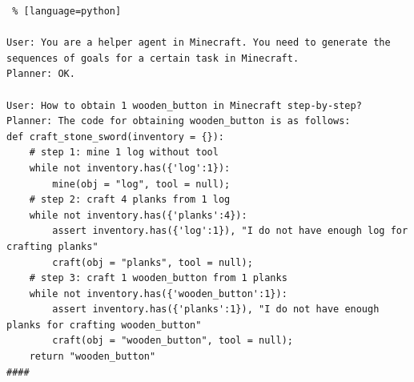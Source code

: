 \begin{lstlisting} % [language=python]  

User: You are a helper agent in Minecraft. You need to generate the sequences of goals for a certain task in Minecraft.
Planner: OK.

User: How to obtain 1 wooden_button in Minecraft step-by-step?
Planner: The code for obtaining wooden_button is as follows:
def craft_stone_sword(inventory = {}):
    # step 1: mine 1 log without tool
    while not inventory.has({'log':1}):
        mine(obj = "log", tool = null); 
    # step 2: craft 4 planks from 1 log
    while not inventory.has({'planks':4}):
        assert inventory.has({'log':1}), "I do not have enough log for crafting planks"
        craft(obj = "planks", tool = null);
    # step 3: craft 1 wooden_button from 1 planks
    while not inventory.has({'wooden_button':1}):
        assert inventory.has({'planks':1}), "I do not have enough planks for crafting wooden_button"
        craft(obj = "wooden_button", tool = null);
    return "wooden_button"
####


\end{lstlisting}
